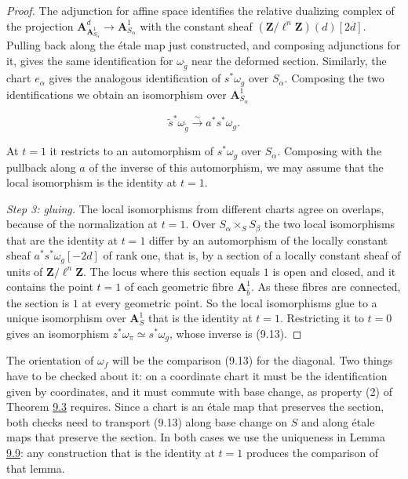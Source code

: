 \documentclass[11pt]{article}
\begin{document}
\begin{proof}[{Proof}]
The adjunction for affine space identifies the relative dualizing complex of the projection \(\mathbf A^d_{\mathbf A^1_{S_\alpha}}\to\mathbf A^1_{S_\alpha}\) with the constant sheaf \((\mathbf Z/\ell^n\mathbf Z)(d)[2d]\). Pulling back along the étale map just constructed, and composing adjunctions for it, gives the same identification for \(\omega_{\widetilde g}\) near the deformed section. Similarly, the chart \(e_\alpha\) gives the analogous identification of \(s^{*}\omega_{g}\) over \(S_\alpha\). Composing the two identifications we obtain an isomorphism over \(\mathbf A^1_{S_\alpha}\)

\[
\widetilde s^{*}\omega_{\widetilde g}\xrightarrow{\sim}
a^{*}s^{*}\omega_{g}.
\]

At \(t=1\) it restricts to an automorphism of \(s^{*}\omega_{g}\) over \(S_\alpha\). Composing with the pullback along \(a\) of the inverse of this automorphism, we may assume that the local isomorphism is the identity at \(t=1\).

\emph{Step 3: gluing.} The local isomorphisms from different charts agree on overlaps, because of the normalization at \(t=1\). Over \(S_\alpha\times_SS_\beta\) the two local isomorphisms that are the identity at \(t=1\) differ by an automorphism of the locally constant sheaf \(a^{*}s^{*}\omega_g[-2d]\) of rank one, that is, by a section of a locally constant sheaf of units of \(\mathbf Z/\ell^n\mathbf Z\). The locus where this section equals \(1\) is open and closed, and it contains the point \(t=1\) of each geometric fibre \(\mathbf A^1_{\bar b}\). As these fibres are connected, the section is \(1\) at every geometric point. So the local isomorphisms glue to a unique isomorphism over \(\mathbf A^1_S\) that is the identity at \(t=1\). Restricting it to \(t=0\) gives an isomorphism \(z^{*}\omega_{\pi}\simeq s^{*}\omega_g\), whose inverse is (9.13).
\end{proof}

\label{bp29}%
The orientation of \(\omega_f\) will be the comparison (9.13) for the diagonal. Two things have to be checked about it: on a coordinate chart it must be the identification given by coordinates, and it must commute with base change, as property (2) of Theorem \hyperref[bp9]{9.3} requires. Since a chart is an étale map that preserves the section, both checks need to transport (9.13) along base change on \(S\) and along étale maps that preserve the section. In both cases we use the uniqueness in Lemma \hyperref[bp27]{9.9}: any construction that is the identity at \(t=1\) produces the comparison of that lemma.
\end{document}
